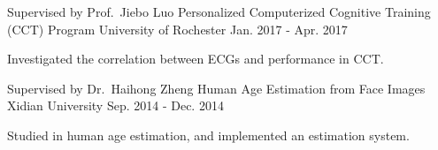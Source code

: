 
\begin{cventries}

\cventry
{Supervised by Prof.\ Jiebo Luo} %
{Personalized Computerized Cognitive Training (CCT) Program} %
{University of Rochester} %
{Jan. 2017 - Apr. 2017} %
{
  \begin{cvitems} %
    \item {Investigated the correlation between ECGs and performance in CCT.}
  \end{cvitems}
}

  \cventry
    {Supervised by Dr.\ Haihong Zheng} %
    {Human Age Estimation from Face Images} %
    {Xidian University} %
    {Sep. 2014 - Dec. 2014} %
    {
      \begin{cvitems} %
        \item {Studied in human age estimation, and implemented an estimation system.}
      \end{cvitems}
    }

\end{cventries}
